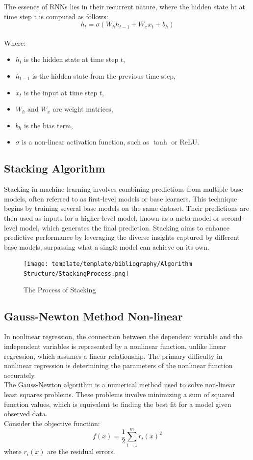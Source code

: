 \documentclass{ieeeojies}
\begin{document}
The essence of RNNs lies in their recurrent nature, where the hidden state ht at time step t is computed as follows:\\
\[h_t = \sigma(W_h h_{t-1} + W_x x_t + b_h)\] \\
Where:
\begin{itemize}
    \item $h_t$ is the hidden state at time step $t$,
    \item $h_{t-1}$ is the hidden state from the previous time step,
    \item $x_t$ is the input at time step $t$,
    \item $W_h$ and $W_x$ are weight matrices,
    \item $b_h$ is the bias term,
    \item $\sigma$ is a non-linear activation function, such as $\tanh$ or ReLU.
\end{itemize}

\subsection{Stacking Algorithm}

Stacking in machine learning involves combining predictions from multiple base models, often referred to as first-level models or base learners. This technique begins by training several base models on the same dataset. Their predictions are then used as inputs for a higher-level model, known as a meta-model or second-level model, which generates the final prediction. Stacking aims to enhance predictive performance by leveraging the diverse insights captured by different base models, surpassing what a single model can achieve on its own. \\

\begin{figure}[H]
    \centering
    \texttt{[image: template/template/bibliography/Algorithm Structure/StackingProcess.png]}
    \caption{The Process of Stacking}
    \label{fig:1}
\end{figure}

\subsection{Gauss-Newton Method Non-linear}
In nonlinear regression, the connection between the dependent variable and the independent variables is represented by a nonlinear function, unlike linear regression, which assumes a linear relationship. The primary difficulty in nonlinear regression is determining the parameters of the nonlinear function accurately. \\
The Gauss-Newton algorithm is a numerical method used to solve non-linear least squares problems. These problems involve minimizing a sum of squared function values, which is equivalent to finding the best fit for a model given observed data. \\
Consider the objective function:
\[f(x) = \frac{1}{2} \sum_{i=1}^{m} r_i(x)^2\]
where \( r_i(x) \) are the residual errors.
\end{document}
